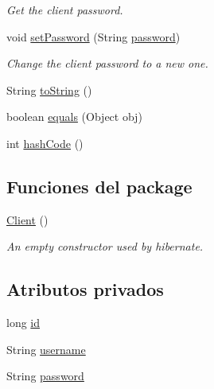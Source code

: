 \begin{DoxyCompactItemize}
\begin{DoxyCompactList}\small\item\em Get the client password. \end{DoxyCompactList}\item 
void \mbox{\hyperlink{classcom_1_1ruralhousejsf_1_1domain_1_1_client_a89d703e0377510769b326334f31fbb8d}{set\+Password}} (String \mbox{\hyperlink{classcom_1_1ruralhousejsf_1_1domain_1_1_client_a1914bdf0282fd4a34b890a6fb775619e}{password}})
\begin{DoxyCompactList}\small\item\em Change the client password to a new one. \end{DoxyCompactList}\item 
String \mbox{\hyperlink{classcom_1_1ruralhousejsf_1_1domain_1_1_client_a9af93d16608b629f3606f859b0ec85e9}{to\+String}} ()
\item 
boolean \mbox{\hyperlink{classcom_1_1ruralhousejsf_1_1domain_1_1_client_acf199d84c39f08cea14078ef175be9f5}{equals}} (Object obj)
\item 
int \mbox{\hyperlink{classcom_1_1ruralhousejsf_1_1domain_1_1_client_aaa86bcfe5247f3aeae9daec9600cf70c}{hash\+Code}} ()
\end{DoxyCompactItemize}
\subsection*{Funciones del \textquotesingle{}package\textquotesingle{}}
\begin{DoxyCompactItemize}
\item 
\mbox{\hyperlink{classcom_1_1ruralhousejsf_1_1domain_1_1_client_a351f5095f2aa19b4b43bd39c069d7e43}{Client}} ()
\begin{DoxyCompactList}\small\item\em An empty constructor used by hibernate. \end{DoxyCompactList}\end{DoxyCompactItemize}
\subsection*{Atributos privados}
\begin{DoxyCompactItemize}
\item 
long \mbox{\hyperlink{classcom_1_1ruralhousejsf_1_1domain_1_1_client_ab353a203ee0d84148e34fbb27ff0dbb8}{id}}
\item 
String \mbox{\hyperlink{classcom_1_1ruralhousejsf_1_1domain_1_1_client_a0d105bbb8e72c4a5b70ec43f59227882}{username}}
\item 
String \mbox{\hyperlink{classcom_1_1ruralhousejsf_1_1domain_1_1_client_a1914bdf0282fd4a34b890a6fb775619e}{password}}
\end{DoxyCompactItemize}

